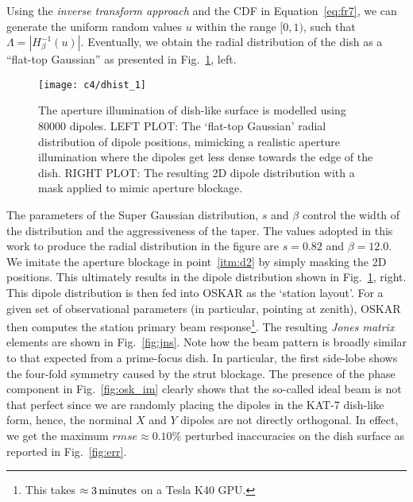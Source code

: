 \noindent Using the \emph{inverse transform approach} and the CDF in Equation~\ref{eq:fr7}, we can generate the uniform random values $u$ within the range $[0,1)$, 
such that $\varLambda = |H_{\beta}^{-1}(u)|$. Eventually, we obtain the radial distribution of the dish as a \enquote{flat-top Gaussian} as presented in Fig.~\ref{fig:layout}, left. 

\begin{figure}[ht]
   \centering
      \texttt{[image: c4/dhist\_1]} %
     \caption{The aperture illumination of dish-like surface is modelled using $80000$ dipoles.
        LEFT PLOT: The \enquote*{flat-top Gaussian} radial distribution of dipole positions, mimicking a realistic aperture illumination where 
        the dipoles get less dense towards the edge of the dish.
        RIGHT PLOT: The resulting 2D dipole distribution  with a mask applied to mimic aperture blockage.}        
    \label{fig:layout}
   \end{figure}
 \FloatBarrier 
The parameters of the Super Gaussian distribution, $s$ and $\beta$ control the width of the distribution and the aggressiveness of the taper. 
 The values adopted in this work to produce the  radial distribution in the figure are $s = 0.82$ and  $\beta = 12.0$.\\
\noindent  We imitate the aperture blockage in point~\ref{itm:d2} by simply masking the 2D positions. This ultimately results in the dipole distribution 
shown in Fig.~\ref{fig:layout}, right. 
This dipole distribution is then fed into OSKAR as the \enquote*{station layout}. For a given set of observational parameters (in particular, pointing at zenith), 
OSKAR then computes the station primary beam response\footnote{{This takes $\approx 3 \, \rm minutes$} on a Tesla K40 GPU.}.
The resulting \emph{Jones matrix} elements are shown in Fig.~\ref{fig:jns}. 
Note how the beam pattern is broadly similar to that expected from a prime-focus dish. In particular, the first side-lobe shows the four-fold symmetry caused by the strut blockage.
The presence of the phase component in Fig.~\ref{fig:osk_im} clearly shows that the so-called ideal beam is not that perfect since we are randomly placing the dipoles in 
the KAT-7 dish-like form, hence, the norminal $X$ and $Y$ dipoles are not directly orthogonal. In effect, we get the maximum $rmse \approx 0.10 \%$ perturbed inaccuracies on 
the dish surface as reported in Fig.~\ref{fig:err}.
%
% 

